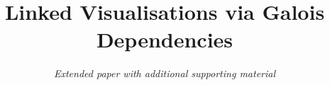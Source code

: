 \documentclass[acmsmall,screen]{acmart}
\begin{document}
\title{Linked Visualisations via Galois Dependencies}
\ifappendices
   \subtitle{\emph{Extended paper with additional supporting material}}
\fi


\maketitle








\clearpage
\pagebreak


\ifappendices
   \clearpage
   \appendix
   
   \clearpage
   
   
\fi
\end{document}
